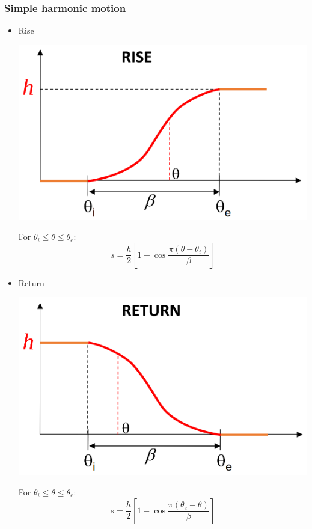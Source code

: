 \documentclass[11pt]{article}
\begin{document}
\subsubsection{Simple harmonic motion}
\label{sec:orga282046}
\begin{itemize}
\item Rise
\begin{center}
\includegraphics[width=.9\linewidth]{./images/formula-method-simple-harmonic-motion-rise-graph.png}
\end{center}

For \(\theta_i \le \theta \le \theta_e\):
\[s = \frac{h}{2} \left[1 - \cos \frac{\pi (\theta - \theta_i)}{\beta} \right]\]

\item Return
\begin{center}
\includegraphics[width=.9\linewidth]{./images/formula-method-simple-harmonic-motion-return-graph.png}
\end{center}

For \(\theta_i \le \theta \le \theta_e\):
\[s = \frac{h}{2} \left[1 - \cos \frac{\pi (\theta_e - \theta)}{\beta} \right]\]
\end{itemize}
\end{document}
